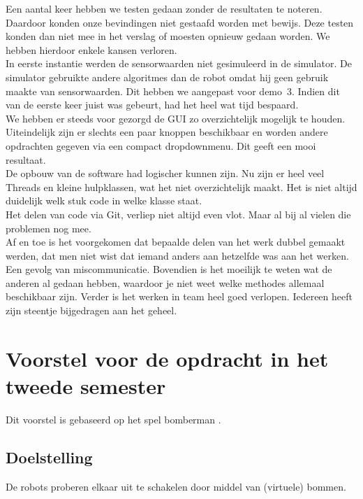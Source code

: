 \documentclass[eind]{penoverslag}
\begin{document}
Een aantal keer hebben we testen gedaan zonder de resultaten te noteren. Daardoor konden onze bevindingen niet gestaafd worden met bewijs. Deze testen konden dan niet mee in het verslag of moesten opnieuw gedaan worden. We hebben hierdoor enkele kansen verloren.\\

In eerste instantie werden de sensorwaarden niet gesimuleerd in de simulator. De simulator gebruikte andere algoritmes dan de robot omdat hij geen gebruik maakte van sensorwaarden. Dit hebben we aangepast voor demo~3. Indien dit van de eerste keer juist was gebeurt, had het heel wat tijd bespaard.\\

We hebben er steeds voor gezorgd de GUI zo overzichtelijk mogelijk te houden. Uiteindelijk zijn er slechts een paar knoppen beschikbaar en worden andere opdrachten gegeven via een compact dropdownmenu. Dit geeft een mooi resultaat.\\

De opbouw van de software had logischer kunnen zijn. Nu zijn er heel veel Threads en kleine hulpklassen, wat het niet overzichtelijk maakt. Het is niet altijd duidelijk welk stuk code in welke klasse staat.\\

Het delen van code via Git, verliep niet altijd even vlot. Maar al bij al vielen die problemen nog mee.\\

Af en toe is het voorgekomen dat bepaalde delen van het werk dubbel gemaakt werden, dat men niet wist dat iemand anders aan hetzelfde was aan het werken. Een gevolg van miscommunicatie. Bovendien is het moeilijk te weten wat de anderen al gedaan hebben, waardoor je niet weet welke methodes allemaal beschikbaar zijn. Verder is het werken in team heel goed verlopen. Iedereen heeft zijn steentje bijgedragen aan het geheel.

\section{Voorstel voor de opdracht in het tweede semester}
\label{Assec:voorstelOpdracht}
Dit voorstel is gebaseerd op het spel bomberman \cite{bomberman}.

\subsection{Doelstelling}
De robots proberen elkaar uit te schakelen door middel van (virtuele) bommen.
\end{document}
